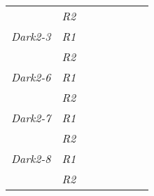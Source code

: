 \begin{table}[h]
\begin{tabular}{@{}|l|l|llllll@{}}
                     & \textit{R2}          &                                         &                                        &                                         &                                             &                       &                                          \\ \cmidrule(r){1-2}
\textit{Dark2-3}     & \textit{R1}          &                                         &                                        &                                         & \multicolumn{1}{l|}{}                       & \multicolumn{1}{l|}{} &                                          \\ \cmidrule(lr){2-2}
                     & \textit{R2}          &                                         &                                        &                                         &                                             &                       &                                          \\ \cmidrule(r){1-2}
\textit{Dark2-6}     & \textit{R1}          &                                         &                                        &                                         & \multicolumn{1}{l|}{}                       & \multicolumn{1}{l|}{} &                                          \\ \cmidrule(lr){2-2}
                     & \textit{R2}          &                                         &                                        &                                         &                                             &                       &                                          \\ \cmidrule(r){1-2}
\textit{Dark2-7}     & \textit{R1}          &                                         &                                        &                                         & \multicolumn{1}{l|}{}                       & \multicolumn{1}{l|}{} &                                          \\ \cmidrule(lr){2-2}
                     & \textit{R2}          &                                         &                                        &                                         &                                             &                       &                                          \\ \cmidrule(r){1-2}
\textit{Dark2-8}     & \textit{R1}          &                                         &                                        &                                         & \multicolumn{1}{l|}{}                       & \multicolumn{1}{l|}{} &                                          \\ \cmidrule(lr){2-2} \cmidrule(l){7-8} 
                     & \textit{R2}          &                                         &                                        &                                         &                                             &                       &                                          \\ \cmidrule(r){1-2}
\end{tabular}
\end{table}



